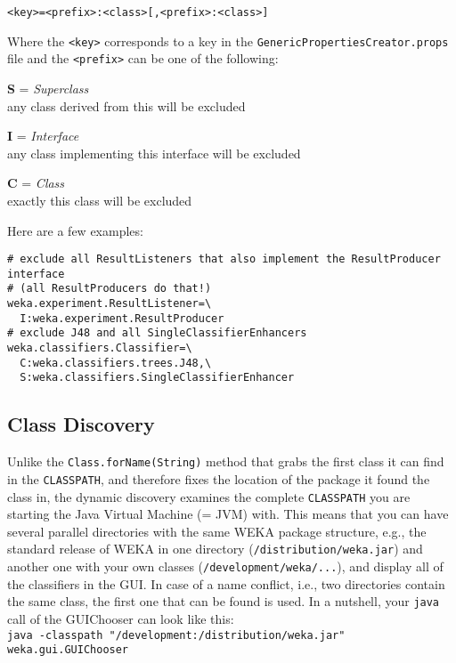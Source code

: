 {\small \verb^<key>=<prefix>:<class>[,<prefix>:<class>]^\\}

\noindent Where the \verb=<key>= corresponds to a key in the
\verb=GenericPropertiesCreator.props= file and the \verb=<prefix>= can
be one of the following:
\begin{tight_itemize}
\item \textbf{S} = \textit{Superclass}\\
  any class derived from this will be excluded
\item \textbf{I} = \textit{Interface}\\
  any class implementing this interface will be excluded
\item \textbf{C} = \textit{Class}\\
  exactly this class will be excluded
\end{tight_itemize}
Here are a few examples:
{\small \begin{verbatim}
# exclude all ResultListeners that also implement the ResultProducer interface
# (all ResultProducers do that!)
weka.experiment.ResultListener=\
  I:weka.experiment.ResultProducer
# exclude J48 and all SingleClassifierEnhancers
weka.classifiers.Classifier=\
  C:weka.classifiers.trees.J48,\
  S:weka.classifiers.SingleClassifierEnhancer
\end{verbatim}}

\subsection{Class Discovery}
Unlike the \verb=Class.forName(String)= method that grabs the first class it
can find in the \verb=CLASSPATH=, and therefore fixes the location of the
package it found the class in, the dynamic discovery examines the
complete \verb=CLASSPATH= you are starting the Java Virtual Machine (= JVM)
with. This means that you can have several parallel directories with
the same WEKA package structure, e.g., the standard release of WEKA in
one directory (\verb=/distribution/weka.jar=) and another one with your own
classes (\verb=/development/weka/...=), and display all of the classifiers in
the GUI. In case of a name conflict, i.e., two directories contain the
same class, the first one that can be found is used. In a nutshell,
your \texttt{java} call of the GUIChooser can look like this:\\

{\small \verb=java -classpath "/development:/distribution/weka.jar" weka.gui.GUIChooser=\\}

